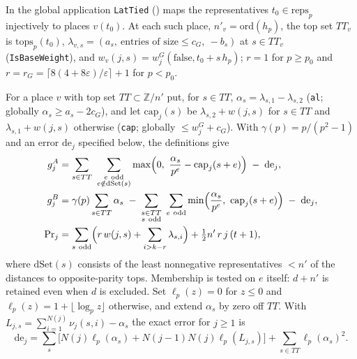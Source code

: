 In the global application \texttt{LatTied} () maps
the representatives $t_0\in\mathrm{reps}_p$ injectively to places $v(t_0)$. At each such place, $n'_v=\mathrm{ord}(h_p)$, the top set $TT_v$ is $\mathrm{tops}_p(t_0)$,
$\lambda_{v,s}=(a_s,\ \text{entries of size}\le c_G,\ -b_s)$ at $s\in TT_v$ (\texttt{IsBaseWeight}), and
$w_v(j,s)=w^G_j(\mathrm{false},t_0+s\,h_p)$; $r=1$ for $p\ge p_0$ and $r=r_G=\lceil 8(4+8\varepsilon)/\varepsilon\rceil+1$
for $p<p_0$.

\begin{definition}\label{def:G-local-gains}
For a place $v$ with top set $TT\subset\mathbb Z/n'$ put, for $s\in TT$, $\alpha_s=\lambda_{s,1}-\lambda_{s,2}$
(\texttt{al}; globally $\alpha_s\ge a_s-2c_G$), and let $\mathrm{cap}_j(s)$ be $\lambda_{s,2}+w(j,s)$ for $s\in TT$ and
$\lambda_{s,1}+w(j,s)$ otherwise (\texttt{cap}; globally $\le w_j^G+c_G$). With $\gamma(p)=p/(p^{2}-1)$ and an
error $\mathrm{de}_j$ specified below, the definitions give
\begin{align*}
  g^{A}_j &=\sum_{s\in TT}\ \sum_{\substack{e\ \mathrm{odd}\\ e\notin \mathrm{dSet}(s)}}
      \max\Bigl(0,\ \frac{\alpha_s}{p^{e}}-\mathrm{cap}_j(s+e)\Bigr)\;-\;\mathrm{de}_j,\\
  g^{B}_j &=\gamma(p)\sum_{s\in TT}\alpha_s\;-\;\sum_{\substack{s\in TT\\ s\ \mathrm{odd}}}\ \sum_{e\ \mathrm{odd}}
      \min\Bigl(\frac{\alpha_s}{p^{e}},\ \mathrm{cap}_j(s+e)\Bigr)\;-\;\mathrm{de}_j,\\
  \mathrm{Pr}_j &=\sum_{s\ \mathrm{odd}}\Bigl(r\,w(j,s)+\sum_{i>k-r}\lambda_{s,i}\Bigr)+\tfrac12 n'\,r\,j\,(t+1),
\end{align*}
where $\mathrm{dSet}(s)$ consists of the least nonnegative representatives $<n'$ of the distances to opposite-parity tops. Membership is tested on $e$ itself: $d+n'$ is retained even when $d$ is excluded.
Set $\ell_p(z)=0$ for $z\le0$ and $\ell_p(z)=1+\lfloor\log_p z\rfloor$ otherwise, and extend $\alpha_s$ by zero off $TT$.
With $L_{j,s}=\sum_{i=1}^{N(j)}\nu_j(s,i)-\alpha_s$ the exact error for $j\ge1$ is
\[
 \mathrm{de}_j=\sum_s \bigl[N(j)\ell_p(\alpha_s)+N(j-1)N(j)\ell_p(L_{j,s})\bigr]
          +\sum_{s\in TT}\ell_p(\alpha_s)^2 .
\]
\end{definition}
